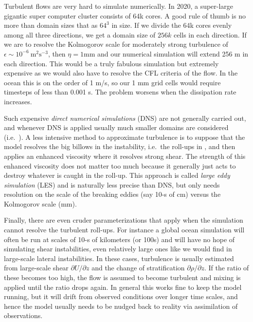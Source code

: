 \documentclass[11pt]{article}
\begin{document}
Turbulent flows are very hard to simulate numerically.  In 2020, a super-large
gigantic super computer cluster consists of 64k cores.  A good rule of thumb is
no more than domain sizes that as $64^3$ in size.  If we divide the 64k cores
evenly among all three directions, we get a domain size of $256k$ cells in each
direction.   If we are to resolve the Kolmogorov scale for moderately strong
turbulence of $\epsilon \sim 10^{-6}\ \mathrm{m^2s^{-3}}$, then $\eta =  1
\mathrm{mm}$ and our numerical simulation will extend 256 m in each direction. 
This would be a truly fabulous simulation but extremely expensive as we would
also have to resolve the CFL criteria of the flow.  In the ocean this is on the
order of 1 m/s, so our 1 mm grid cells would require timesteps of less than
0.001 s.  The problem worsens when the dissipation rate increases.  

Such expensive \emph{direct numerical simulations} (DNS) are not generally
carried out, and whenever DNS is applied usually much smaller domains are
considered (i.e.\ ).  A less intensive method to
approximate turbulence is to suppose that the model resolves the big billows in
the instability, i.e.\ the roll-ups in , and then applies
an enhanced viscosity where it resolves strong shear.  The strength of this
enhanced viscosity does not matter too much because it generally just acts to
destroy whatever is caught in the roll-up.  This approach is called \emph{large
eddy simulation} (LES) and is naturally less precise than DNS, but only needs
resolution on the scale of the breaking eddies (say 10-s of cm) versus the
Kolmogorov scale (mm).  

Finally, there are even cruder parameterizations that apply when the simulation
cannot resolve the turbulent roll-ups.  For instance a global ocean simulation
will often be run at scales of 10-s of kilometers (or 100s) and will have no
hope of simulating shear instabilities, even relatively large ones like we
would find in large-scale lateral instabilities.  In these cases, turbulence is
usually estimated from large-scale shear $\partial U / \partial z$ and the
change of stratification $\partial \rho / \partial z$.  If the ratio of these
becomes too high, the flow is assumed to become turbulent and mixing is applied
until the ratio drops again.  In general this works fine to keep the model
running, but it will drift from observed conditions over longer time scales,
and hence the model usually needs to be nudged back to reality via assimilation
of observations.   



\end{document}
